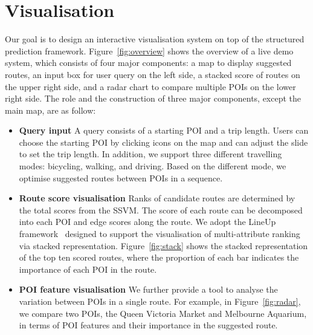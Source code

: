 \section{Visualisation}
Our goal is to design an interactive visualisation system on top of the structured prediction framework.
Figure~\ref{fig:overview} shows the overview of a live demo system, which consists of four major components: a map to display suggested routes, an input box for user query on the left side, a stacked score of routes on the upper right side, and a radar chart to compare multiple POIs on the lower right side. 
The role and the construction of three major components, except the main map, are as follow:
\begin{itemize}
\item \textbf{Query input} A query consists of a starting POI and a trip length. 
Users can choose the starting POI by clicking icons on the map and can adjust the slide to set the trip length. 
In addition, we support three different travelling modes: bicycling, walking, and driving.
Based on the different mode, we optimise suggested routes between POIs in a sequence.
\item \textbf{Route score visualisation} Ranks of candidate routes are determined by the total scores from the SSVM. 
The score of each route can be decomposed into each POI and edge scores along the route. 
We adopt the LineUp framework~\cite{gratzl2013lineup} designed to support the visualisation of multi-attribute ranking via stacked representation. 
Figure~\ref{fig:stack} shows the stacked representation of the top ten scored routes, where the proportion of each bar indicates the importance of each POI in the route.
\item \textbf{POI feature visualisation} We further provide a tool to analyse the variation between POIs in a single route. 
For example, in Figure~\ref{fig:radar}, we compare two POIs, the Queen Victoria Market and Melbourne Aquarium, in terms of POI features and their importance in the suggested route. 
\end{itemize}

